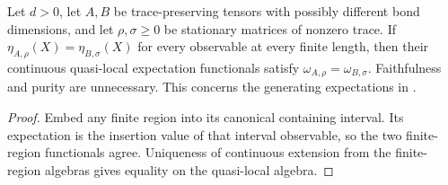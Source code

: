 \begin{lemma}
    \label{thm:quasi_local_mps_expectation_equality}
    \leanok
    Let $d>0$, let $A,B$ be trace-preserving tensors with possibly
    different bond dimensions, and let $\rho,\sigma\geq0$ be stationary
    matrices of nonzero trace. If
    $\eta_{A,\rho}(X)=\eta_{B,\sigma}(X)$ for every observable at every
    finite length, then their continuous quasi-local expectation
    functionals satisfy $\omega_{A,\rho}=\omega_{B,\sigma}$.
    Faithfulness and purity are unnecessary. This concerns the generating
    expectations in \cite[Section~3]{Nachtergaele1996Spectral}.
\end{lemma}
\begin{proof}\leanok
    Embed any finite region into its canonical containing interval.
    Its expectation is the insertion value of that interval observable,
    so the two finite-region functionals agree. Uniqueness of continuous
    extension from the finite-region algebras gives equality on the
    quasi-local algebra.
\end{proof}

